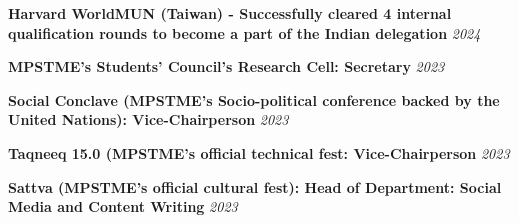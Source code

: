 \vspace{-3mm} 

\begin{cventries}
	

\customcventry
	{\textbf{Harvard WorldMUN (Taiwan) - Successfully cleared 4 internal qualification rounds to become a part of the Indian delegation}} %
	{} %
	{}%
	{\textit{2024}} %
	{}
\vspace{-3.5mm} 

\customcventry
	{\textbf{MPSTME's Students' Council's Research Cell: Secretary}} %
	{} %
	{}%
	{\textit{2023}} %
	{}
\vspace{-3.5mm} 

 \customcventry
	{\textbf{Social Conclave (MPSTME's Socio-political conference backed by the United Nations): Vice-Chairperson}} %
	{} %
	{}%
	{\textit{2023}} %
	{}
\vspace{-3.5mm} 

 \customcventry
	{\textbf{Taqneeq 15.0 (MPSTME’s official technical fest: Vice-Chairperson}} %
	{} %
	{}%
	{\textit{2023}} %
	{}
\vspace{-3.5mm} 

 \customcventry
	{\textbf{Sattva (MPSTME’s official cultural fest): Head of Department: Social Media and Content Writing}} %
	{} %
	{}%
	{\textit{2023}} %
	{}
\vspace{-3.5mm} 




\vspace{-6.0mm}  

 
\end{cventries}
